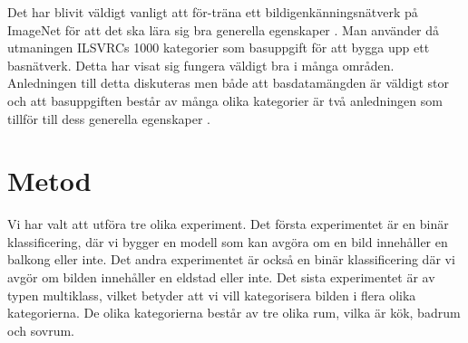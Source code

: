 \documentclass[]{kththesis}
\begin{document}
Det har blivit väldigt vanligt att för-träna ett bildigenkänningsnätverk på ImageNet för att det ska lära sig bra generella egenskaper \parencite{huh2016makes}. Man använder då utmaningen ILSVRCs 1000 kategorier som basuppgift för att bygga upp ett basnätverk. Detta har visat sig fungera väldigt bra i många områden. Anledningen till detta diskuteras men både att basdatamängden är väldigt stor och att basuppgiften består av många olika kategorier är två anledningen som tillför till dess generella egenskaper \parencite{huh2016makes}.

\chapter{Metod}
Vi har valt att utföra tre olika experiment. Det första experimentet är en binär klassificering, där vi bygger en modell som kan avgöra om en bild innehåller en balkong eller inte. Det andra experimentet är också en binär klassificering där vi avgör om bilden innehåller en eldstad eller inte. Det sista experimentet är av typen multiklass, vilket betyder att vi vill kategorisera bilden i flera olika kategorierna. De olika kategorierna består av tre olika rum, vilka är kök, badrum och sovrum.
\end{document}
